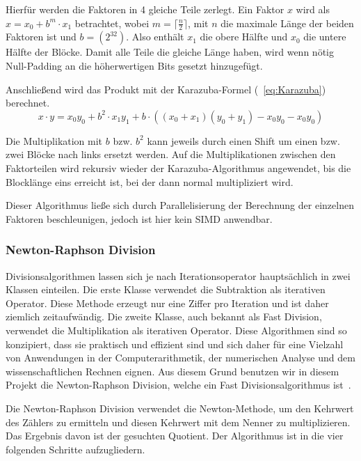 \documentclass[course=erap]{aspdoc}
\begin{document}
Hierfür werden die Faktoren in 4 gleiche Teile zerlegt.
Ein Faktor $x$ wird als $x = x_0 + b^m \cdot x_1$ betrachtet, wobei $m = \lceil \frac{n}{2} \rceil$, mit $n$ die maximale Länge der beiden Faktoren ist und $b =(2^{32})$. Also enthält $x_1$ die obere Hälfte und $x_0$ die untere Hälfte der Blöcke. Damit alle Teile die gleiche Länge haben, wird wenn nötig Null-Padding an die höherwertigen Bits gesetzt hinzugefügt.

Anschließend wird das Produkt mit der Karazuba-Formel (~\ref{eq:Karazuba}) berechnet.
\begin{equation}\label{eq:Karazuba}
x \cdot y = x_0 y_0 +  b^2 \cdot x_1y_1 + b \cdot((x_0 + x_1)(y_0+y_1)- x_0y_0 - x_0y_0)
\end{equation}  

Die Multiplikation mit $b$ bzw. $b^2$ kann jeweils durch einen Shift um einen bzw. zwei Blöcke nach links ersetzt werden.\newline
Auf die Multiplikationen zwischen den Faktorteilen wird rekursiv wieder der Karazuba-Algorithmus angewendet, bis die Blocklänge eins erreicht ist, bei der dann normal multipliziert wird.

Dieser Algorithmus ließe sich durch Parallelisierung der Berechnung der einzelnen Faktoren beschleunigen, jedoch ist hier kein SIMD anwendbar.

\subsubsection{Newton-Raphson Division}

Divisionsalgorithmen lassen sich je nach Iterationsoperator hauptsächlich in zwei Klassen einteilen. Die erste Klasse verwendet die Subtraktion als iterativen Operator. 
Diese Methode erzeugt nur eine Ziffer pro Iteration und ist daher ziemlich zeitaufwändig. Die zweite Klasse, auch 
bekannt als Fast Division, verwendet die Multiplikation als iterativen Operator. Diese Algorithmen sind so konzipiert, 
dass sie praktisch und effizient sind und sich daher für eine Vielzahl von Anwendungen in der Computerarithmetik, 
der numerischen Analyse und dem wissenschaftlichen Rechnen eignen. Aus diesem Grund benutzen wir in diesem Projekt die
Newton-Raphson Division, welche ein Fast Divisionsalgorithmus ist~\cite{divisionclass}.

Die Newton-Raphson Division verwendet die Newton-Methode, um den Kehrwert des Zählers zu ermitteln und diesen Kehrwert mit dem 
Nenner zu multiplizieren. Das Ergebnis davon ist der gesuchten Quotient. Der Algorithmus ist in die vier folgenden Schritte aufzugliedern.
\end{document}

